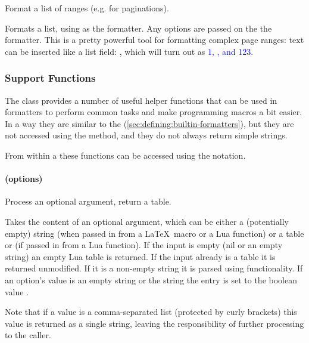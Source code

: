 \documentclass[12pt]{scrartcl}
\begin{document}
Format a list of ranges (e.g. for paginations).

Formats a list, using  as the formatter.  Any options are passed
on the the  formatter.  This is a pretty powerful tool for
formatting complex page ranges: text can be inserted like a 
list field:
\texttt{}, which will turn out as
\textcolor{blue}{1, ,  and 123}.%


\subsubsection{Support Functions}
\label{sec:defining:support-functions}

The  class provides a number of useful helper functions that
can be used in formatters to perform common tasks and make programming macros a
bit easier.  In a way they are similar to the  (\vref{sec:defining:builtin-formatters}), but they are not accessed using the
 method, and they do not always return simple strings.

From within a  these functions can be accessed using the
 notation.


\paragraph{ (options)}

Process an optional argument, return a table.

\noindent Takes the content of an optional argument, which can be either a
(potentially empty) string (when passed in from a \LaTeX\ macro or a Lua
function) or a table or  (if passed in from a Lua function).  If the
input is empty (nil or an empty string) an empty Lua table is returned.  If the
input already is a table it is returned unmodified.  If it is a non-empty string
it is parsed using  functionality.  If an option's value
is an empty string or the string  the entry is set to the boolean
value .

Note that if a value is a comma-separated list (protected by curly brackets)
this value is returned as a single string, leaving the responsibility of further
processing to the caller.
\end{document}
